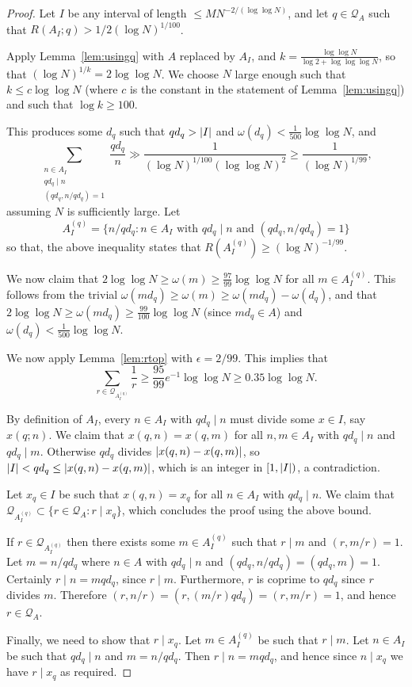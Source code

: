 \begin{proof}
Let $I$ be any interval of length $\leq MN^{-2/(\log\log N)}$, and let $q\in\mathcal{Q}_A$ such that $R(A_I;q)> 1/2(\log N)^{1/100}$.

Apply Lemma~\ref{lem:usingq} with $A$ replaced by $A_I$, and $k=\frac{\log\log N}{\log 2+\log\log\log N}$, so that $(\log N)^{1/k}=2\log\log N$. We choose $N$ large enough such that $k\leq c\log\log N$ (where $c$ is the constant in the statement of Lemma~\ref{lem:usingq}) and such that $\log k\geq 100$.

This produces some $d_q$ such that $qd_q>\left\lvert I\right\rvert$ and $\omega(d_q)<\tfrac{1}{500}\log\log N$, and
  \[\sum_{\substack{n\in A_I\\ qd_q\mid n\\ (qd_q,n/qd_q)=1}}\frac{qd_q}{n}\gg \frac{1}{(\log N)^{1/100}(\log\log N)^2}\geq \frac{1}{(\log N)^{1/99}},\]
assuming $N$ is sufficiently large. Let
  \[A_I^{(q)}=\{ n/qd_q : n\in A_I\textrm{ with }qd_q\mid n\textrm{ and }(qd_q,n/qd_q)=1\}\]
  so that, the above inequality states that $R(A_I^{(q)})\geq (\log N)^{-1/99}$.

We now claim that $2\log\log N\geq \omega(m) \geq \tfrac{97}{99}\log\log N$ for all $m\in A_I^{(q)}$. This follows from the trivial $\omega(md_q)\geq \omega(m)\geq \omega(md_q)-\omega(d_q)$, and that $2\log\log N\geq \omega(md_q)\geq  \frac{99}{100}\log\log N$ (since $md_q\in A$) and $\omega(d_q)<\frac{1}{500}\log\log N$.

We now apply Lemma~\ref{lem:rtop} with $\epsilon=2/99$. This implies that
  \[\sum_{r\in \mathcal{Q}_{A_I^{(q)}}}\frac{1}{r}\geq \frac{95}{99}e^{-1}\log\log N\geq 0.35\log\log N.\]


    By definition of $A_I$, every $n\in A_I$ with $qd_q\mid n$ must divide some $x\in I$, say $x(q;n)$. We claim that $x(q,n)=x(q,m)$ for all $n,m\in A_I$ with $qd_q\mid n$ and $qd_q\mid m$. Otherwise $qd_q$ divides $\left\lvert x(q,n)-x(q,m)\right\rvert$, so $\left\lvert I\right\rvert<qd_q\leq \left\lvert x(q,n)-x(q,m)\right\rvert$, which is an integer in $[1,\left\lvert I\right\rvert)$, a contradiction.

  Let $x_q\in I$ be such that $x(q,n)=x_q$ for all $n\in A_I$ with $qd_q \mid n$. We claim that $\mathcal{Q}_{A_I^{(q)}}\subset \{ r\in \mathcal{Q}_A : r\mid x_q\}$, which concludes the proof using the above bound.

If $r\in \mathcal{Q}_{A_I^{(q)}}$ then there exists some $m\in A_I^{(q)}$ such that $r\mid m$ and $(r,m/r)=1$. Let $m=n/qd_q$ where $n\in A$ with $qd_q\mid n$ and $(qd_q,n/qd_q)=(qd_q,m)=1$. Certainly $r\mid n = mqd_q$, since $r\mid m$. Furthermore, $r$ is coprime to $qd_q$ since $r$ divides $m$. Therefore $(r,n/r)=(r,(m/r)qd_q)=(r,m/r)=1$, and hence $r\in \mathcal{Q}_A$.

Finally, we need to show that $r\mid x_q$. Let $m\in A_I^{(q)}$ be such that $r\mid m$. Let $n\in A_I$ be such that $qd_q\mid n$ and $m=n/qd_q$. Then $r\mid n=mqd_q$, and hence since $n\mid x_q$ we have $r\mid x_q$ as required.
\end{proof}

